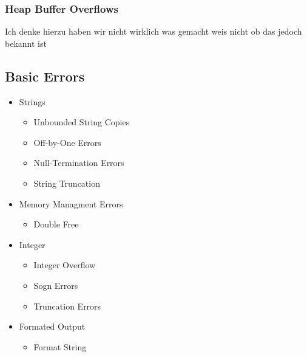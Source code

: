 \documentclass[a4paper, 12pt]{article}
\begin{document}
\subsubsection{Heap Buffer Overflows}
Ich denke hierzu haben wir nicht wirklich was gemacht weis nicht ob das jedoch bekannt ist

\subsection{Basic Errors}
\begin{itemize}
\item Strings
\begin{itemize}
\item Unbounded String Copies
\item Off-by-One Errors
\item Null-Termination Errors
\item String Truncation
\end{itemize}
\item Memory Managment Errors
\begin{itemize}
\item Double Free
\end{itemize}
\item Integer
\begin{itemize}
\item Integer Overflow
\item Sogn Errors
\item Truncation Errors
\end{itemize}
\item Formated Output
\begin{itemize}
\item Format String
\end{itemize}
\end{itemize} 
\end{document}
